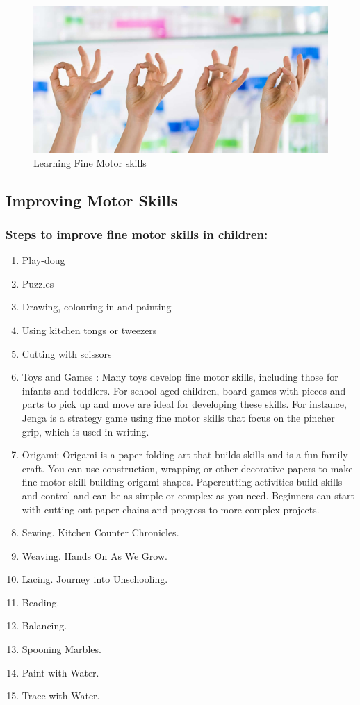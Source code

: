 \begin{figure}[h!]
	\centering
	\includegraphics[scale=0.15]{img/brain-fine-motor.jpg}
	\caption{Learning Fine Motor skills}
	\label{fig:world}
\end{figure}


\subsection{Improving Motor Skills}


\subsubsection{Steps to improve fine motor skills in children:}

\begin{enumerate}
\item  Play-doug
\item  Puzzles
\item  Drawing, colouring in and painting
\item  Using kitchen tongs or tweezers
\item  Cutting with scissors
\item Toys and Games : Many toys develop fine motor skills, including those for infants and toddlers. For school-aged children, board games with pieces and parts to pick up and move are ideal for developing these skills. For instance, Jenga is a strategy game using fine motor skills that focus on the pincher grip, which is used in writing.
\item Origami: Origami is a paper-folding art that builds skills and is a fun family craft. You can use construction, wrapping or other decorative papers to make fine motor skill building origami shapes.  Papercutting activities build skills and control and can be as simple or complex as you need. Beginners can start with cutting out paper chains
and progress to more complex projects.
\item Sewing. Kitchen Counter Chronicles.
\item Weaving. Hands On As We Grow.
\item Lacing. Journey into Unschooling.
\item Beading.
\item Balancing.
\item Spooning Marbles.
\item Paint with Water.
\item Trace with Water.

\end{enumerate}

